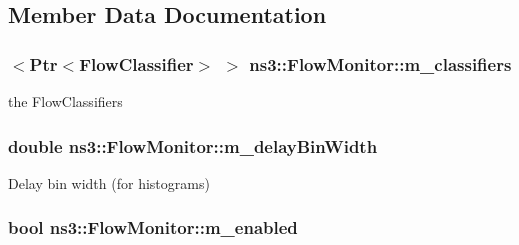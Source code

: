 \subsection{Member Data Documentation}
\subsubsection[{\texorpdfstring{m\+\_\+classifiers}{m_classifiers}}]{$<${\bf Ptr}$<${\bf Flow\+Classifier}$>$ $>$ ns3\+::\+Flow\+Monitor\+::m\+\_\+classifiers\hspace{0.3cm}{\ttfamily [private]}}\hypertarget{classns3_1_1FlowMonitor_a5a4e22e2b8a08b926f5f054ae082a60b}{}\label{classns3_1_1FlowMonitor_a5a4e22e2b8a08b926f5f054ae082a60b}


the Flow\+Classifiers 

\subsubsection[{\texorpdfstring{m\+\_\+delay\+Bin\+Width}{m_delayBinWidth}}]{\setlength{\rightskip}{0pt plus 5cm}double ns3\+::\+Flow\+Monitor\+::m\+\_\+delay\+Bin\+Width\hspace{0.3cm}{\ttfamily [private]}}\hypertarget{classns3_1_1FlowMonitor_ac8f534e4fc447540021387c854ec8fc1}{}\label{classns3_1_1FlowMonitor_ac8f534e4fc447540021387c854ec8fc1}


Delay bin width (for histograms) 

\subsubsection[{\texorpdfstring{m\+\_\+enabled}{m_enabled}}]{\setlength{\rightskip}{0pt plus 5cm}bool ns3\+::\+Flow\+Monitor\+::m\+\_\+enabled\hspace{0.3cm}{\ttfamily [private]}}\hypertarget{classns3_1_1FlowMonitor_a26ecae1b883d6625091b07e2698f0d45}{}\label{classns3_1_1FlowMonitor_a26ecae1b883d6625091b07e2698f0d45}


